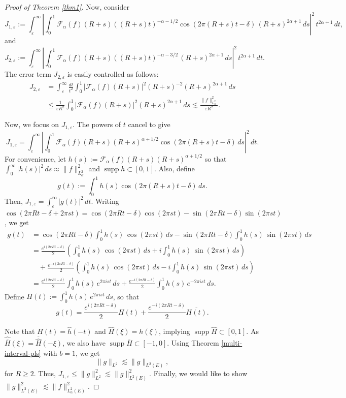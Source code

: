 \documentclass[11pt,a4paper,reqno,dvipsnames]{amsart}
\newcommand{\F}{\mathcal{F}}
\newcommand{\ep}{\varepsilon}
\renewcommand{\ge}{\geqslant}
\renewcommand{\le}{\leqslant}
\numberwithin{equation}{section}
\theoremstyle{plain}
\theoremstyle{definition}
\theoremstyle{remark}
\begin{document}
\begin{proof}[Proof of Theorem \ref{thm1}]
Now, consider 
$$J_{1, \ep} := \int_\ep^\infty \left|\int_0^1 \mathcal{F}_\alpha(f)(R+s) ((R+s)t)^{-\alpha-1/2} \cos(2\pi(R+s)t-\delta)\, (R+s)^{2\alpha + 1}\, ds\right|^2 \, t^{2\alpha + 1}\, dt,$$
and
$$J_{2, \ep} := \int_\ep^\infty \left|\int_0^1 \mathcal{F}_\alpha(f)(R+s) ((R+s)t)^{-\alpha-3/2}\, (R+s)^{2\alpha + 1}\, ds\right|^2 \, t^{2\alpha + 1}\, dt.$$
The error term $J_{2, \ep}$ is easily controlled as follows:
\begin{align*}
    J_{2,\ep} &= \int_\ep^\infty \frac{dt}{t^2} \int_0^1 |\F_\alpha(f)(R+s)|^2 (R+s)^{-2} (R+s)^{2\alpha+1}\, ds\\
    &\le \frac{1}{\ep R^2} \int_0^1 |\F_\alpha(f)(R+s)|^2 (R+s)^{2\alpha+1}\, ds \lesssim \frac{\|f\|^2_{L^2_\alpha}}{\ep R^2}.
\end{align*}

Now, we focus on $J_{1, \ep}$. The powers of $t$ cancel to give
$$J_{1,\ep} = \int_\ep^\infty \left|\int_0^1 \mathcal{F}_\alpha(f)(R+s) (R+s)^{\alpha+1/2} \cos(2\pi(R+s)t-\delta)\, ds\right|^2 \, dt.$$
For convenience, let $h(s) := \mathcal{F}_\alpha(f)(R+s) (R+s)^{\alpha+1/2}$ so that $\int_0^\infty |h(s)|^2\, ds \approx \|f\|^2_{L^2_\alpha}$ and $\operatorname{supp} h \subset [0,1]$. Also, define $$g(t) := \int_0^1 h(s) \cos(2\pi(R+s)t - \delta)\, ds.$$ Then, $J_{1,\ep} = \int_\ep^\infty |g(t)|^2\, dt$. Writing $\cos(2\pi Rt-\delta + 2\pi st) = \cos(2\pi Rt-\delta) \cos(2\pi st) - \sin(2\pi Rt-\delta) \sin(2\pi st)$, we get 
\begin{align*}
g(t) &= \cos(2\pi Rt-\delta) \int_0^1 h(s)\, \cos(2\pi st)\, ds 
     - \sin(2\pi Rt-\delta) \int_0^1 h(s)\, \sin(2\pi st)\, ds \\
&= \frac{e^{i(2\pi Rt-\delta)}}{2} 
    \left( \int_0^1 h(s)\, \cos(2\pi st)\, ds 
    + i \int_0^1 h(s)\, \sin(2\pi st)\, ds \right) \\
&\quad +  \frac{e^{-i(2\pi Rt-\delta)}}{2}
    \left( \int_0^1 h(s)\, \cos(2\pi st)\, ds 
    - i \int_0^1 h(s)\, \sin(2\pi st)\, ds \right)\\
    &= \frac{e^{i(2\pi Rt-\delta)}}{2}  \int_0^1 h(s)\, e^{2\pi ist}\, ds + \frac{e^{-i(2\pi Rt-\delta)}}{2} \int_0^1 h(s)\, e^{-2\pi ist}\, ds.
\end{align*}
Define $H(t) := \int_0^1 h(s) \, e^{2\pi ist}\, ds$, so that
$$g(t) = \frac{e^{i(2\pi Rt-\delta)}}{2}  H(t) + \frac{e^{-i(2\pi  Rt-\delta)}}{2} \overline{H(t)}.$$

Note that $H(t) = \widehat{h}\left(-t\right)$ and $\widehat{H}(\xi) = h(\xi)$, implying $\operatorname{supp} \widehat{H} \subset [0, 1]$. As $\widehat{\overline{H}}(\xi) = \overline{\widehat{H}}(-\xi)$, we also have $\operatorname{supp} \widehat{\overline{H}} \subset [-1, 0]$. Using Theorem \ref{multi-interval-pls} \cite{k1} with $b = 1$, we get $$\|g\|_{L^2} \lesssim \|g\|_{L^2(E)},$$
for $R \ge 2$. Thus, $J_{1,\ep} \le \|g\|^2_{L^2} \lesssim \|g\|_{L^2(E)}^2.$ Finally, we would like to show $\|g\|_{L^2(E)}^2 \lesssim \|f\|^2_{L^2_\alpha(E)}$. 


\end{proof}
\end{document}
